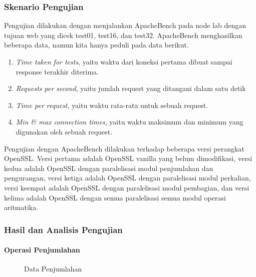 \subsubsection{Skenario Pengujian}
Pengujian dilakukan dengan menjalankan ApacheBench pada node lab dengan tujuan web yang dicek test01, test16, dan test32. ApacheBench menghasilkan beberapa data, namun kita hanya peduli pada data berikut.
\begin{enumerate}[label=\roman*.]
  \item \textit{Time taken for tests}, yaitu waktu dari koneksi pertama dibuat sampai response terakhir diterima.
  \item \textit{Requests per second}, yaitu jumlah request yang ditangani dalam satu detik
  \item \textit{Time per request}, yaitu waktu rata-rata untuk sebuah request.
  \item \textit{Min \& max connection times}, yaitu waktu maksimum dan minimum yang digunakan oleh sebuah request.
\end{enumerate}

Pengujian dengan ApacheBench dilakukan terhadap beberapa versi perangkat OpenSSL. Versi pertama adalah OpenSSL vanilla yang belum dimodifikasi, versi kedua adalah OpenSSL dengan paralelisasi modul penjumlahan dan pengurangan, versi ketiga adalah OpenSSL dengan paralelisasi modul perkalian, versi keempat adalah OpenSSL dengan paralelisasi modul pembagian, dan versi kelima adalah OpenSSL dengan semua paralelisasi semua modul operasi aritmatika.

\subsubsection{Hasil dan Analisis Pengujian}

\paragraph{Operasi Penjumlahan}
\begin{figure}
  \centering
  \caption{Data Penjumlahan}
  \label{fig:add_data}
\end{figure}
%


